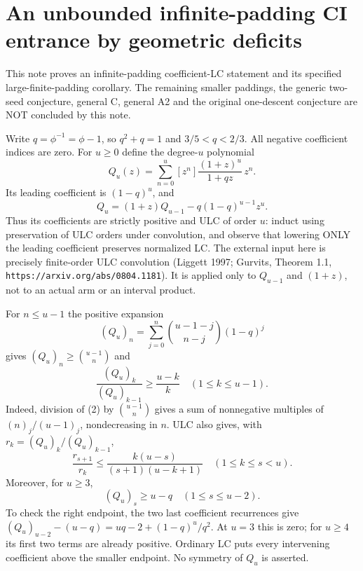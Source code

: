 \section{An unbounded infinite-padding CI entrance by geometric deficits}
This note proves an infinite-padding coefficient-LC statement and its
specified large-finite-padding corollary. The remaining smaller paddings,
the generic two-seed conjecture, general C, general A2 and the original
one-descent conjecture are NOT concluded by this note.

Write $q=\phi^{-1}=\phi-1$, so $q^2+q=1$ and
$3/5<q<2/3$. All negative coefficient indices are zero.
For $u\ge0$ define the degree-$u$ polynomial
\[
 Q_u(z)=\sum_{n=0}^u [z^n]\frac{(1+z)^u}{1+qz}\,z^n.
\]
Its leading coefficient is $(1-q)^u$, and
\[
 Q_u=(1+z)Q_{u-1}-q(1-q)^{u-1}z^u.                 \tag{1}
\]
Thus its coefficients are strictly positive and ULC of order $u$:
induct using preservation of ULC orders under convolution, and observe
that lowering ONLY the leading coefficient preserves normalized LC.
The external input here is precisely finite-order ULC convolution
(Liggett 1997; Gurvits, Theorem 1.1,
\texttt{https://arxiv.org/abs/0804.1181}). It is applied only to
$Q_{u-1}$ and $(1+z)$, not to an actual arm or an interval product.

For $n\le u-1$ the positive expansion
\[
 (Q_u)_n=\sum_{j=0}^n {u-1-j\choose n-j}(1-q)^j       \tag{2}
\]
gives $(Q_u)_n\ge {u-1\choose n}$ and
\[
 \frac{(Q_u)_k}{(Q_u)_{k-1}}\ge\frac{u-k}{k}
                  \quad(1\le k\le u-1).             \tag{3}
\]
Indeed, division of (2) by ${u-1\choose n}$ gives a sum
of nonnegative multiples of $(n)_j/(u-1)_j$, nondecreasing in $n$.
ULC also gives, with $r_k=(Q_u)_k/(Q_u)_{k-1}$,
\[
 \frac{r_{s+1}}{r_k}\le
 \frac{k(u-s)}{(s+1)(u-k+1)}\quad(1\le k\le s<u).
                                                               \tag{4}
\]
Moreover, for $u\ge3$,
\[
 (Q_u)_s\ge u-q\quad(1\le s\le u-2).                \tag{5}
\]
To check the right endpoint, the two last coefficient recurrences give
$(Q_u)_{u-2}-(u-q)=uq-2+(1-q)^u/q^2$. At $u=3$ this is zero;
for $u\ge4$ its first two terms are already positive.
Ordinary LC puts every intervening coefficient above the smaller
endpoint. No symmetry of $Q_u$ is asserted.

